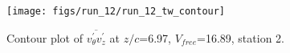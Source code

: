 \begin{figure}[H]
\centering
\texttt{[image: figs/run\_12/run\_12\_tw\_contour]}
\caption{Contour plot of $\overline{v_{\theta}^{\prime} v_{z}^{\prime}}$ at $z/c$=6.97, $V_{free}$=16.89, station 2.}
\label{fig:run_12_tw_contour}
\end{figure}


